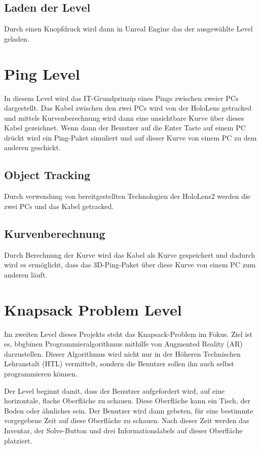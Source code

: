 \subsection{Laden der Level}
Durch einen Knopfdruck wird dann in Unreal Engine das der ausgewählte
Level geladen.

\section{Ping Level}
In diesem Level wird das IT-Grundprinzip eines Pings zwischen zweier
PCs dargestellt. Das Kabel zwischen den zwei PCs wird von der
HoloLens getracked und mittels Kurvenberechnung wird dann eine
unsichtbare Kurve über dieses Kabel gezeichnet. Wenn dann der Benutzer
auf die Enter Taste auf einem PC drückt wird ein Ping-Paket simuliert
und auf dieser Kurve von einem PC zu dem anderen geschickt.

\subsection{Object Tracking}
Durch verwendung von bereitgestellten Technologien der HoloLens2
werden die zwei PCs und das Kabel getracked.

\subsection{Kurvenberechnung}
Durch Berechnung der Kurve wird das Kabel als Kurve gespeichert
und dadurch wird es ermöglicht, dass das 3D-Ping-Paket über diese
Kurve von einem PC zum anderen läuft.

\section{Knapsack Problem Level}
Im zweiten Level dieses Projekts steht das Knapsack-Problem im Fokus.
Ziel ist es, bbgbinen Programmieralgorithmus mithilfe von Augmented Reality
(AR) darzustellen. Dieser Algorithmus wird nicht nur in der Höheren
Technischen Lehranstalt (HTL) vermittelt, sondern die Benutzer sollen
ihn auch selbst programmieren können.

Der Level beginnt damit, dass der Benutzer aufgefordert wird, auf eine
horizontale, flache Oberfläche zu schauen. Diese Oberfläche kann ein Tisch,
der Boden oder ähnliches sein. Der Benutzer wird dann gebeten, für eine bestimmte
vorgegebene Zeit auf diese Oberfläche zu schauen. Nach dieser Zeit werden das Inventar,
der Solve-Button und drei Informationslabels auf dieser Oberfläche platziert.

